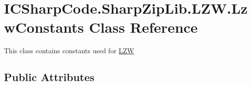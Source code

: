 \hypertarget{class_i_c_sharp_code_1_1_sharp_zip_lib_1_1_l_z_w_1_1_lzw_constants}{}\section{I\+C\+Sharp\+Code.\+Sharp\+Zip\+Lib.\+L\+Z\+W.\+Lzw\+Constants Class Reference}
\label{class_i_c_sharp_code_1_1_sharp_zip_lib_1_1_l_z_w_1_1_lzw_constants}


This class contains constants used for \hyperlink{namespace_i_c_sharp_code_1_1_sharp_zip_lib_1_1_l_z_w}{L\+ZW}  


\subsection*{Public Attributes}
